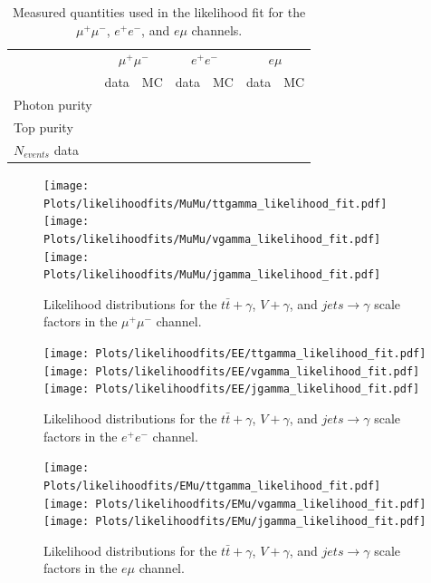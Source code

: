 \begin{table}
\begin{center}
\begin{tabular}{l|cc|cc|cc}
\hline
	& \multicolumn{2}{c|}{$\mu^{+}\mu^{-}$} & \multicolumn{2}{c|}{$e^{+}e^{-}$} & \multicolumn{2}{c}{$e\mu$} \\
	& data & MC & data & MC & data & MC \\
\hline
	Photon purity & & & & & &\\
	Top purity & & & & & &\\
	$N_{events}$ data & & & & & & \\
\hline	
\end{tabular}
\end{center}
\caption{Measured quantities used in the likelihood fit for the $\mu^{+}\mu^{-}$, $e^{+}e^{-}$, and $e\mu$ channels.}
\label{tab-likelihoodVariables}
\end{table}		

\begin{figure}
\texttt{[image: Plots/likelihoodfits/MuMu/ttgamma\_likelihood\_fit.pdf]}
\texttt{[image: Plots/likelihoodfits/MuMu/vgamma\_likelihood\_fit.pdf]}
\texttt{[image: Plots/likelihoodfits/MuMu/jgamma\_likelihood\_fit.pdf]}
\caption{Likelihood distributions for the $t\bar{t}+\gamma$, $V+\gamma$, and $jets\to \gamma$ scale factors in the $\mu^{+}\mu^{-}$ channel.}
\label{fig-SFLikelihoodFitsMuMu}
\end{figure}

\begin{figure}
\texttt{[image: Plots/likelihoodfits/EE/ttgamma\_likelihood\_fit.pdf]}
\texttt{[image: Plots/likelihoodfits/EE/vgamma\_likelihood\_fit.pdf]}
\texttt{[image: Plots/likelihoodfits/EE/jgamma\_likelihood\_fit.pdf]}
\caption{Likelihood distributions for the $t\bar{t}+\gamma$, $V+\gamma$, and $jets\to \gamma$ scale factors in the $e^{+}e^{-}$ channel.}
\label{fig-SFLikelihoodFitsEE}
\end{figure}

\begin{figure}
\texttt{[image: Plots/likelihoodfits/EMu/ttgamma\_likelihood\_fit.pdf]}
\texttt{[image: Plots/likelihoodfits/EMu/vgamma\_likelihood\_fit.pdf]}
\texttt{[image: Plots/likelihoodfits/EMu/jgamma\_likelihood\_fit.pdf]}
\caption{Likelihood distributions for the $t\bar{t}+\gamma$, $V+\gamma$, and $jets\to \gamma$ scale factors in the $e\mu$ channel.}
\label{fig-SFLikelihoodFitsEMu}
\end{figure}



